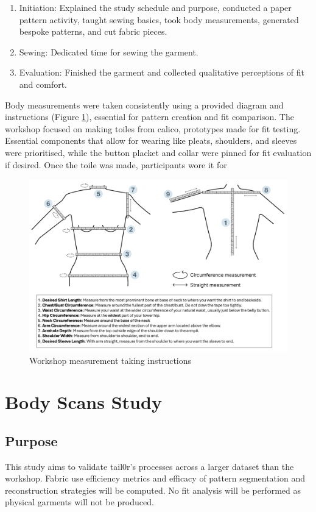 \begin{enumerate}
    \item Initiation: Explained the study schedule and purpose, conducted a paper pattern activity, taught sewing basics, took body measurements, generated bespoke patterns, and cut fabric pieces.
    \item Sewing: Dedicated time for sewing the garment.
    \item Evaluation: Finished the garment and collected qualitative perceptions of fit and comfort.
\end{enumerate}
Body measurements were taken consistently using a provided diagram and instructions (Figure \ref{fig:workshopmeasure}), essential for pattern creation and fit comparison. The workshop focused on making toiles from calico, prototypes made for fit testing. Essential components that allow for wearing like pleats, shoulders, and sleeves were prioritised, while the button placket and collar were pinned for fit evaluation if desired. Once the toile was made, participants wore it for
\begin{figure} [H]
    \centering
    \includegraphics[width = \textwidth]{Images/workshopmeasure.png}
    \caption{Workshop measurement taking instructions \cite{noauthor_standard_nodate}}
    \label{fig:workshopmeasure}
\end{figure}


\section{Body Scans Study}
\subsection{Purpose}
This study aims to validate tail0r's processes across a larger dataset than the workshop. Fabric use efficiency metrics and efficacy of pattern segmentation and reconstruction strategies will be computed. No fit analysis will be performed as physical garments will not be produced.

